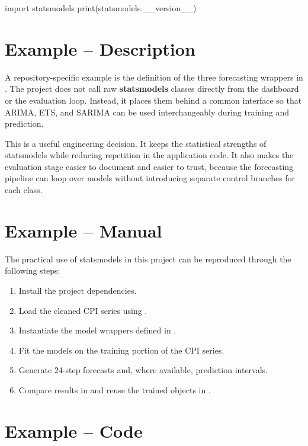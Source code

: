 \begin{Python}[caption={Verifying the statsmodels installation}, label={lst:verify_statsmodels}]
import statsmodels
print(statsmodels.__version__)
\end{Python}

\section{Example -- Description}

A repository-specific example is the definition of the three forecasting wrappers in . The project does not call raw \textbf{statsmodels} classes directly from the dashboard or the evaluation loop. Instead, it places them behind a common interface so that ARIMA, ETS, and SARIMA can be used interchangeably during training and prediction.

This is a useful engineering decision. It keeps the statistical strengths of statsmodels while reducing repetition in the application code. It also makes the evaluation stage easier to document and easier to trust, because the forecasting pipeline can loop over models without introducing separate control branches for each class.

\section{Example -- Manual}

The practical use of statsmodels in this project can be reproduced through the following steps:

\begin{enumerate}
    \item Install the project dependencies.
    \item Load the cleaned CPI series using .
    \item Instantiate the model wrappers defined in .
    \item Fit the models on the training portion of the CPI series.
    \item Generate 24-step forecasts and, where available, prediction intervals.
    \item Compare results in  and reuse the trained objects in .
\end{enumerate}

\section{Example -- Code}

